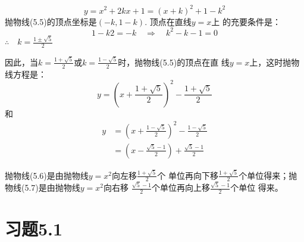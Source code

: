 \begin{solution}
\begin{equation}
    y=x^2+2kx+1=(x+k)^2+1-k^2
\end{equation}
抛物线(5.5)的顶点坐标是$(-k,1-k)$. 顶点在直线$y=x$上
的充要条件是：
\[1-k2=-k\quad \Rightarrow\quad k^2-k-1=0\]
$\therefore\quad k=\frac{1\pm\sqrt{5}}{2}$

因此，当$k=\frac{1+\sqrt{5}}{2}$或$k=\frac{1-\sqrt{5}}{2}$时，抛物线(5.5)的顶点在直
线$y=x$上，这时抛物线方程是：
\begin{equation}
y=\left(x+\frac{1+\sqrt{5}}{2}\right)^2-\frac{1+\sqrt{5}}{2}
\end{equation}
和
\begin{equation}
    \begin{split}
 y&=\left(x+\frac{1-\sqrt{5}}{2}\right)^2-\frac{1-\sqrt{5}}{2}\\
&=\left(x-\frac{\sqrt{5}-1}{2}\right)+\frac{\sqrt{5}-1}{2}
    \end{split}
\end{equation}  

抛物线(5.6)是由抛物线$y=x^2$向左移$\frac{1+\sqrt{5}}{2}$个
单位再向下移$\frac{1+\sqrt{5}}{2}$个单位得来；抛物线(5.7)是由抛物线$y=x^2$向右移
$\frac{\sqrt{5}-1}{2}$个单位再向上移$\frac{\sqrt{5}-1}{2}$个单位
得来。
\end{solution}

\section*{习题5.1}

